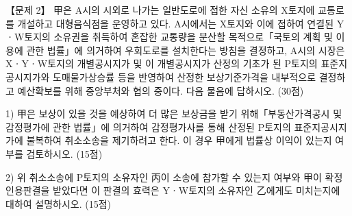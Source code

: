 \begin{longquestion}{【문제 2】}
甲은 A시의 시외로 나가는 일반도로에 접한 자신 소유의 X토지에 교통로를 개설하고 대형음식점을 운영하고 있다. A시에서는 X토지와 이에 접하여 연결된 YㆍW토지의 소유권을 취득하여 혼잡한 교통량을 분산할 목적으로「국토의 계획 및 이용에 관한 법률」에 의거하여 우회도로를 설치한다는 방침을 결정하고, A시의 시장은 XㆍYㆍW토지의 개별공시지가 및 이 개별공시지가 산정의 기초가 된 P토지의 표준지공시지가와 도매물가상승률 등을 반영하여 산정한 보상기준가격을 내부적으로 결정하고 예산확보를 위해 중앙부처와 협의 중이다. 다음 물음에 답하시오. (30점) \par
1) 甲은 보상이 있을 것을 예상하여 더 많은 보상금을 받기 위해「부동산가격공시 및 감정평가에 관한 법률」에 의거하여 감정평가사를 통해 산정된 P토지의 표준지공시지가에 불복하여 취소소송을 제기하려고 한다. 이 경우 甲에게 법률상 이익이 있는지 여부를 검토하시오. (15점) \par
2) 위 취소소송에 P토지의 소유자인 丙이 소송에 참가할 수 있는지 여부와 甲이 확정 인용판결을 받았다면 이 판결의 효력은 YㆍW토지의 소유자인 乙에게도 미치는지에 대하여 설명하시오. (15점) \par
\end{longquestion}
